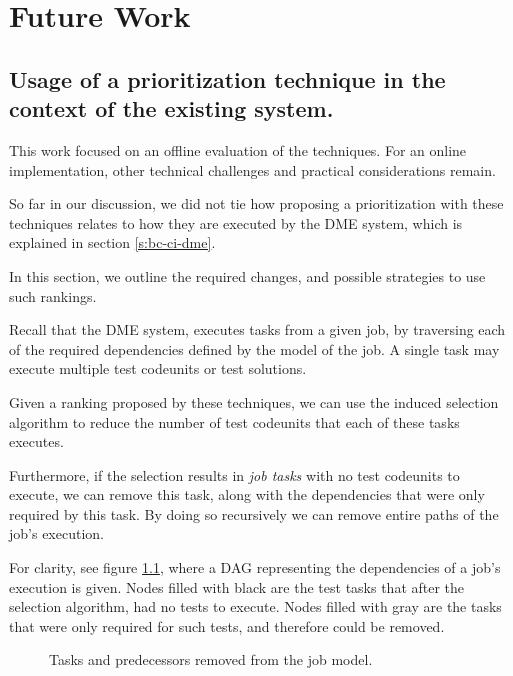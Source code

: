 \chapter{Future Work}\label{s:future}

\section{Usage of a prioritization technique in the context of the existing system.}

This work focused on an offline evaluation of the techniques. For an online implementation,
other technical challenges and practical considerations remain.

So far in our discussion, we did not tie how proposing a prioritization
with these techniques relates to how they are executed by the DME system, which is explained
in section \ref{s:bc-ci-dme}.

In this section, we outline the required changes, and possible strategies to use
such rankings.

Recall that the DME system, executes tasks from a given job, by
traversing each of the required dependencies defined by the model of the job. 
A single task may execute multiple test codeunits or test solutions. 

Given a ranking proposed by these techniques, we can use the induced selection
algorithm to reduce the number of test codeunits that each of these tasks executes.

Furthermore, if the selection results in \emph{job tasks} with no test codeunits to
execute, we can remove this task, along with the dependencies that were 
only required by this task. By doing so recursively we can remove entire paths of the
job's execution.

For clarity, see figure \ref{f:conc-fut-dag-removingtask}, where a DAG representing the dependencies of a job's 
execution is given. Nodes filled with black are the test tasks that after the selection
algorithm, had no tests to execute. Nodes filled with gray are the tasks that were only
required for such tests, and therefore could be removed.

\begin{figure}
    \centering
    \def\svgwidth{0.5\columnwidth}
    
    \caption{Tasks and predecessors removed from the job model.}
    \label{f:conc-fut-dag-removingtask}
\end{figure}

